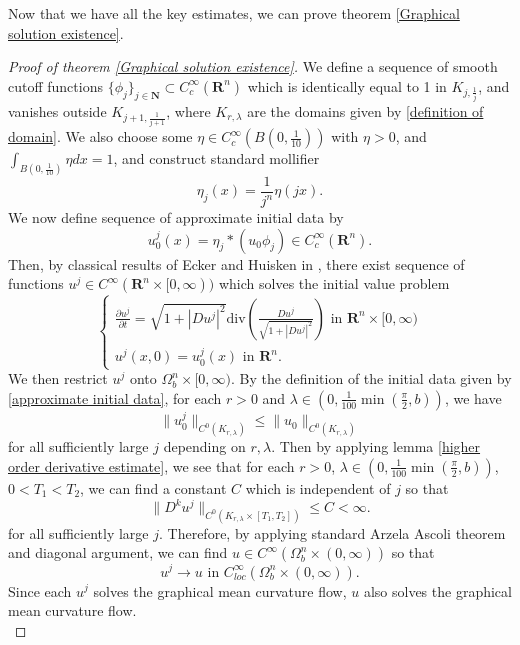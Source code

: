 \documentclass[pdflatex,sn-mathphys-num]{sn-jnl}%
\begin{document}
Now that we have all the key estimates, we can prove theorem \ref{Graphical solution existence}. 
\begin{proof}[Proof of theorem \ref{Graphical solution existence}]
We define a sequence of smooth cutoff functions $\{\phi_j\}_{j \in \mathbf{N}} \subset C^{\infty}_c(\mathbf{R}^n)$ which is identically equal to 1 in $K_{j, \frac{1}{j}}$, and vanishes outside $K_{j+1, \frac{1}{j+1}}$, where $K_{r, \lambda}$ are the domains given by \eqref{definition of domain}. We also choose some $\eta \in C^{\infty}_c(B(0, \frac{1}{10}))$ with $\eta > 0$, and $\int_{B(0, \frac{1}{10})}\eta dx = 1$, and construct standard mollifier
\begin{equation}
    \eta_j(x) = \frac{1}{j^n}\eta(jx).
\end{equation}
We now define sequence of approximate initial data by
\begin{equation}\label{approximate initial data}
    u^j_0(x) = \eta_j * (u_0\phi_j) \in C_c^{\infty}(\mathbf{R}^n).
\end{equation}
Then, by classical results of Ecker and Huisken in \cite{eckerhuisken}, there exist sequence of functions $u^j \in C^{\infty}(\mathbf{R}^n \times [0, \infty))$ which solves the initial value problem
\begin{equation}
    \begin{cases}
        \frac{\partial u^j}{\partial t} = \sqrt{1 + |Du^j|^2}\text{div}(\frac{Du^j}{\sqrt{1 + |Du^j|^2}}) \text{ in }\mathbf{R}^n \times [0, \infty) \\
        u^j(x, 0) = u^j_0(x) \text{ in }\mathbf{R}^n.
    \end{cases}
\end{equation}
We then restrict $u^j$ onto $\Omega^n_b \times [0, \infty)$. By the definition of the initial data given by \eqref{approximate initial data}, for each $r>0$ and $\lambda \in (0, \frac{1}{100}\min(\frac{\pi}{2}, b))$, we have
\begin{equation}\label{key c0 property for appx entire solution}
    \|u^j_0\|_{C^0(K_{r, \lambda})} \leq \|u_0\|_{C^0(K_{r, \lambda})}
\end{equation}
for all sufficiently large $j$ depending on $r, \lambda$. Then by applying lemma \ref{higher order derivative estimate}, we see that for each $r > 0$, $\lambda \in (0, \frac{1}{100}\min(\frac{\pi}{2}, b))$, $0 < T_1 < T_2$, we can find a constant $C$ which is independent of $j$ so that 
\begin{equation}\label{uniform estimate}
    \|D^ku^j\|_{C^0(K_{r, \lambda} \times [T_1, T_2])} \leq C < \infty.
\end{equation}
for all sufficiently large $j$. Therefore, by applying standard Arzela Ascoli theorem and diagonal argument, we can find $u \in C^{\infty}(\Omega^n_b \times (0, \infty))$ so that
\begin{equation}
    u^j \to u \text{ in }C^{\infty}_{loc}(\Omega^n_{b}\times (0, \infty)).
\end{equation}
Since each $u^j$ solves the graphical mean curvature flow, $u$ also solves the graphical mean curvature flow.\\


\end{proof}
\end{document}
